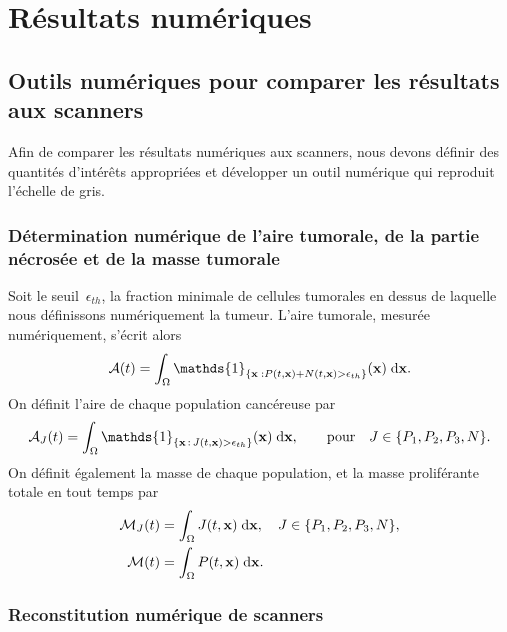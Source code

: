 \documentclass[main.tex]{subfiles}
\begin{document}
\section{Résultats numériques}\label{sec:NumRes}

\subsection{Outils numériques pour comparer les résultats aux scanners}

Afin de comparer les résultats numériques aux scanners, nous devons définir des quantités d'intérêts appropriées et 
développer un outil numérique qui reproduit l'échelle de gris. 
\subsubsection{Détermination numérique de l'aire tumorale, de la partie nécrosée et de la masse tumorale}

Soit le seuil~$\epsilon_{th}$, la fraction minimale de cellules tumorales en dessus de laquelle nous définissons numériquement la tumeur. 
L'aire tumorale, mesurée numériquement, s'écrit alors
\begin{equation}
\label{eq:airetot}
\mathcal{A}(t)=\int_\Omega \mathds{1}_{\{\vecx\;: P(t,\vecx)+N(t,\vecx) >\epsilon_{th}\}}(\vecx)\textrm{\;d}\vecx.
\end{equation}
On définit l'aire de chaque population cancéreuse par
\begin{equation}
\mathcal{A}_J(t)=\int_\Omega
\mathds{1}_{\{\vecx\,:\,J(t,\vecx)>\epsilon_{th}\}}(\vecx)\textrm{\;d}\vecx,
\qquad \text{pour}\quad J \in \{P_1,P_2,P_3,N \}.
\label{eq:airepop}
\end{equation}
On définit également la masse de chaque population, et la masse proliférante totale en tout temps par 
\begin{align}
\mathcal{M}_J(t)&=\int_\Omega J(t,\mathbf{x}) \textrm{\;d}\mathbf{x}, \quad J \in \{P_1,P_2,P_3,N \},
\label{eq:masspop} \\
\mathcal{M}(t)&=\int_\Omega P 
(t,\mathbf{x})\textrm{\;d}\mathbf{x}.
\label{eq:masstot}
\end{align}


\subsubsection{Reconstitution numérique de scanners}
\end{document}
